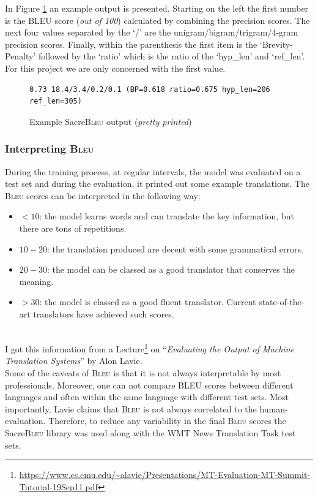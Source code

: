 \documentclass[12pt,a4paper,twoside,openright]{report}
\newcommand{\red}[1]{\textcolor{red}{#1}}
\newcommand{\bleu}{\textsc{Bleu} }
\begin{document}
In Figure \ref{lst:bleu-output} an example output is presented. Starting on the left the first number is the BLEU score (\textit{out of 100}) calculated by combining the precision scores. The next four values separated by the `/' are the unigram/bigram/trigram/4-gram precision scores. Finally, within the parenthesis the first item is the `Brevity-Penalty' followed by the `ratio' which is the ratio of the `hyp\_len' and `ref\_len'. For this project we are only concerned with the first value.

\begin{figure}[H]
\begin{lstlisting}
0.73 18.4/3.4/0.2/0.1 (BP=0.618 ratio=0.675 hyp_len=206 ref_len=305)
\end{lstlisting}
\caption{Example Sacre\bleu output (\textit{pretty printed})}
\label{lst:bleu-output}
\end{figure}


\subsubsection{Interpreting \bleu}
During the training process, at regular intervals, the model was evaluated on a test set and during the evaluation, it printed out some example translations. The \bleu scores can be interpreted in the following way:

\begin{itemize}
    \item $<10$: the model learns words and can translate the key information, but there are tons of repetitions.
    \item $10-20$: the translation produced are decent with some grammatical errors.
    \item $20-30$: the model can be classed as a good translator
    that conserves the meaning.
    \item $>30$: the model is classed as a good fluent translator. Current state-of-the-art translators have achieved such scores.
\end{itemize}
\\
I got this information from a Lecture\footnote{\url{https://www.cs.cmu.edu/~alavie/Presentations/MT-Evaluation-MT-Summit-Tutorial-19Sep11.pdf}} on ``\textit{Evaluating the Output of Machine Translation Systems}'' by Alon Lavie.
\\
Some of the caveats of \bleu is that it is not always interpretable by most professionals. Moreover, one can not compare BLEU scores between different languages and often within the same language with different test sets. Most importantly, Lavie claims that \bleu is not always correlated to the human-evaluation. Therefore, to reduce any variability in the final \bleu scores the Sacre\bleu library was used along with the WMT News Translation Task test sets.
\end{document}
